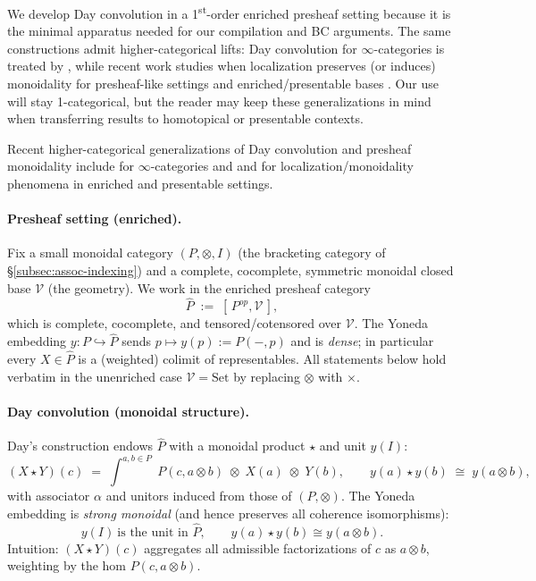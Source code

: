 \documentclass[11pt]{article}
\numberwithin{equation}{section}
\theoremstyle{upright}
\newcommand{\V}{\mathcal{V}}
\begin{document}
We develop Day convolution in a 1\textsuperscript{st}-order enriched presheaf setting because it is the minimal apparatus needed for our compilation and BC arguments. The same constructions admit higher-categorical lifts: Day convolution for $\infty$-categories is treated by \citet{Glasman2016}, while recent work studies when localization preserves (or induces) monoidality for presheaf-like settings and enriched/presentable bases \citep{CnossenEtAl2024,Heine2024WeightedColimits}. Our use will stay 1-categorical, but the reader may keep these generalizations in mind when transferring results to homotopical or presentable contexts.

\medskip
Recent higher-categorical generalizations of Day convolution and presheaf
monoidality include \citet{Glasman2016} for $\infty$-categories and
\citet{CnossenEtAl2024} and \citet{Heine2024WeightedColimits} for
localization/monoidality phenomena in enriched and presentable settings.

\paragraph{Presheaf setting (enriched).}
Fix a small monoidal category $(P,\otimes,I)$ (the bracketing category of
\S\ref{subsec:assoc-indexing}) and a complete, cocomplete, symmetric
monoidal closed base $\V$ (the geometry). We work in the enriched
presheaf category
\[
\widehat P \;:=\; [\,P^{op},\V\,],
\]
which is complete, cocomplete, and tensored/cotensored over $\V$.
The Yoneda embedding $y:P\hookrightarrow \widehat P$ sends
$p\mapsto y(p):=P(-,p)$ and is \emph{dense}; in particular every
$X\in\widehat P$ is a (weighted) colimit of representables.
All statements below hold verbatim in the unenriched case
$\V=\mathrm{Set}$ by replacing $\otimes$ with $\times$.

\paragraph{Day convolution (monoidal structure).}
Day’s construction endows $\widehat P$ with a monoidal product
$\star$ and unit $y(I)$:
\begin{equation}\label{eq:day-conv}
(X\star Y)(c)\;=\;\int^{a,b\in P} \;P(c,a\otimes b)\;\otimes\; X(a)\;\otimes\; Y(b),
\qquad
y(a)\star y(b)\;\cong\; y(a\otimes b),
\end{equation}
with associator $\alpha$ and unitors induced from those of $(P,\otimes)$.
The Yoneda embedding is \emph{strong monoidal} (and hence preserves all
coherence isomorphisms):
\[
y(I)\ \text{is the unit in }\widehat P,\qquad
y(a)\star y(b)\cong y(a\otimes b).
\]
Intuition: $(X\star Y)(c)$ aggregates all admissible factorizations
of $c$ as $a\otimes b$, weighting by the hom $P(c,a\otimes b)$.
\end{document}
